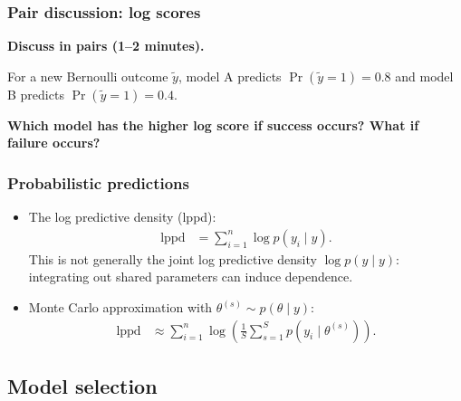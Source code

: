 \documentclass[10pt]{beamer}
\begin{document}
\begin{frame}
\frametitle{Pair discussion: log scores}

  {\color{uured}\textbf{Discuss in pairs (1--2 minutes).}}

  For a new Bernoulli outcome $\tilde y$, model A predicts
  $\Pr(\tilde y=1)=0.8$ and model B predicts $\Pr(\tilde y=1)=0.4$.

  \textbf{Which model has the higher log score if success occurs?
    What if failure occurs?}

\end{frame}

\begin{frame}
\frametitle{Probabilistic predictions}

    \begin{itemize}
      \item The log  predictive density (lppd):
      \begin{align*}
        \text{lppd} &= \sum_{i=1}^n\log p(y_i\mid y).
      \end{align*}
      This is not generally the joint log predictive density $\log p(y\mid y)$:
      integrating out shared parameters can induce dependence.
      \pause
      \item Monte Carlo approximation with $\theta^{(s)}\sim p(\theta\mid y)$:
      \begin{align*}
        \text{lppd} &\approx \sum_{i=1}^n\log\left(\frac{1}{S}
          \sum_{s=1}^S p(y_i\mid\theta^{(s)})\right).
      \end{align*}
  \end{itemize}

\end{frame}


\subsection{Model selection}
\frame{\subsectionpage}
\end{document}
